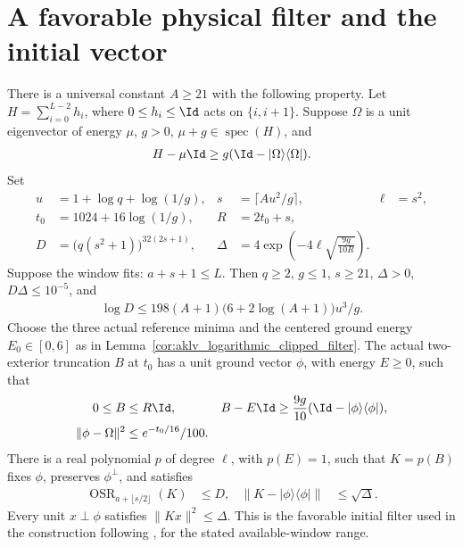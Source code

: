 \section{A favorable physical filter and the initial vector}

\begin{lemma}
    \label{thm:aklv_favorable_physical_filter}
    \leanok
    There is a universal constant $A\ge21$ with the following property.
    Let $H=\sum_{i=0}^{L-2}h_i$, where $0\le h_i\le\Id$ acts on
    $\{i,i+1\}$. Suppose $\Omega$ is a unit eigenvector of energy $\mu$,
    $g>0$, $\mu+g\in\operatorname{spec}(H)$, and
    \begin{align*}
        H-\mu\Id\ge g(\Id-|\Omega\rangle\langle\Omega|).
    \end{align*}
    Set
    \begin{align*}
        u      & =1+\log q+\log(1/g),                            &
        s      & =\lceil Au^2/g\rceil,                           & \ell & =s^2,    \\
        t_0    & =1024+16\log(1/g),                              & R    & =2t_0+s, \\
        D      & =\bigl(q(s^2+1)\bigr)^{32(2s+1)},               &
        \Delta & =4\exp\left(-4\ell\sqrt{\frac{9g}{10R}}\right).
    \end{align*}
    Suppose the window fits: $a+s+1\le L$.
    Then $q\ge2$, $g\le1$, $s\ge21$, $\Delta>0$,
    $D\Delta\le10^{-5}$, and
    \begin{align*}
        \log D\le198(A+1)\bigl(6+2\log(A+1)\bigr)u^3/g.
    \end{align*}
    Choose the three actual reference minima and the centered ground energy
    $E_0\in[0,6]$ as in Lemma~\ref{cor:aklv_logarithmic_clipped_filter}.
    The actual two-exterior truncation $B$ at $t_0$ has a unit ground vector
    $\phi$, with energy $E\ge0$, such that
    \begin{align*}
        0\le B            & \le R\Id,                                       &
        B-E\Id            & \ge\frac{9g}{10}(\Id-|\phi\rangle\langle\phi|),   \\
        \|\phi-\Omega\|^2 & \le e^{-t_0/16}/100.
    \end{align*}
    There is a real polynomial $p$ of degree $\ell$, with $p(E)=1$,
    such that $K=p(B)$ fixes $\phi$, preserves $\phi^\perp$, and satisfies
    \begin{align*}
        \operatorname{OSR}_{a+\lfloor s/2\rfloor}(K) & \le D,          &
        \|K-|\phi\rangle\langle\phi|\|               & \le\sqrt\Delta.
    \end{align*}
    Every unit $x\perp\phi$ satisfies $\|Kx\|^2\le\Delta$.
    This is the favorable initial filter used in the construction following
    \cite[Theorem~6.1]{Arad2013AreaLaw}, for the stated available-window range.
\end{lemma}
